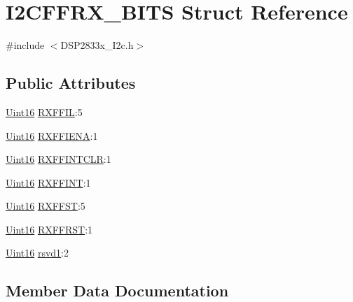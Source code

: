 \hypertarget{struct_i2_c_f_f_r_x___b_i_t_s}{}\section{I2\+C\+F\+F\+R\+X\+\_\+\+B\+I\+T\+S Struct Reference}
\label{struct_i2_c_f_f_r_x___b_i_t_s}


{\ttfamily \#include $<$D\+S\+P2833x\+\_\+\+I2c.\+h$>$}

\subsection*{Public Attributes}
\begin{DoxyCompactItemize}
\item 
\hyperlink{_d_s_p2833x___device_8h_a59a9f6be4562c327cbfb4f7e8e18f08b}{Uint16} \hyperlink{struct_i2_c_f_f_r_x___b_i_t_s_ad73808f17ee330a345fb084a9ba69c13}{R\+X\+F\+F\+I\+L}\+:5
\item 
\hyperlink{_d_s_p2833x___device_8h_a59a9f6be4562c327cbfb4f7e8e18f08b}{Uint16} \hyperlink{struct_i2_c_f_f_r_x___b_i_t_s_a2ce786826a8f31a983b88d8957f1e4c8}{R\+X\+F\+F\+I\+E\+N\+A}\+:1
\item 
\hyperlink{_d_s_p2833x___device_8h_a59a9f6be4562c327cbfb4f7e8e18f08b}{Uint16} \hyperlink{struct_i2_c_f_f_r_x___b_i_t_s_a47c1b464d6ad7dd456440e78e602ca80}{R\+X\+F\+F\+I\+N\+T\+C\+L\+R}\+:1
\item 
\hyperlink{_d_s_p2833x___device_8h_a59a9f6be4562c327cbfb4f7e8e18f08b}{Uint16} \hyperlink{struct_i2_c_f_f_r_x___b_i_t_s_ada0448b1093602277403fcd62cfdf480}{R\+X\+F\+F\+I\+N\+T}\+:1
\item 
\hyperlink{_d_s_p2833x___device_8h_a59a9f6be4562c327cbfb4f7e8e18f08b}{Uint16} \hyperlink{struct_i2_c_f_f_r_x___b_i_t_s_a6de671f4e79e7b979a2eb5957ff76f55}{R\+X\+F\+F\+S\+T}\+:5
\item 
\hyperlink{_d_s_p2833x___device_8h_a59a9f6be4562c327cbfb4f7e8e18f08b}{Uint16} \hyperlink{struct_i2_c_f_f_r_x___b_i_t_s_a91d3c2135e600a2b64d92618c5074eb5}{R\+X\+F\+F\+R\+S\+T}\+:1
\item 
\hyperlink{_d_s_p2833x___device_8h_a59a9f6be4562c327cbfb4f7e8e18f08b}{Uint16} \hyperlink{struct_i2_c_f_f_r_x___b_i_t_s_a6858858e83e9538a5a00ad90cca30c36}{rsvd1}\+:2
\end{DoxyCompactItemize}


\subsection{Member Data Documentation}
\hypertarget{struct_i2_c_f_f_r_x___b_i_t_s_a6858858e83e9538a5a00ad90cca30c36}{}
